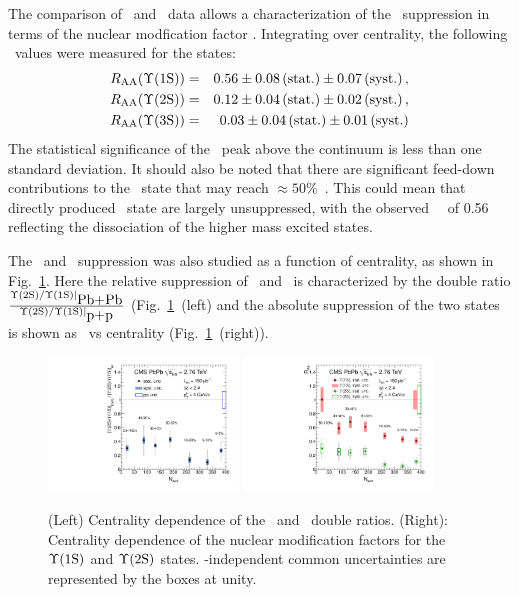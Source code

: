 The comparison of \pp\ and \PbPb\ data allows a characterization of the \PgU\ suppression
in terms of the nuclear modfication factor \Raa.
Integrating over centrality, the following \Raa\ values were measured for the \PgUn states:
\begin{eqnarray}
R_\mathrm{AA} (\Upsilon\mathrm{(1S)}) &=& 0.56 \pm 0.08\,\mbox{(stat.)} \pm 0.07\,\mbox{(syst.)} \,, \\
R_\mathrm{AA} (\Upsilon\mathrm{(2S)}) &=& 0.12 \pm 0.04\,\mbox{(stat.)} \pm 0.02\,\mbox{(syst.)} \,, \nonumber \\
R_\mathrm{AA} (\Upsilon\mathrm{(3S)}) &=& 0.03 \pm 0.04\,\mbox{(stat.)} \pm 0.01\,\mbox{(syst.)}  \nonumber\\
\end{eqnarray}
The statistical significance of the \PgUc\ peak above the continuum is less than one standard deviation.
It should also be noted that there are significant feed-down contributions to 
the \PgUa\ state that may reach $\approx 50\%$~\cite{Affolder:1999wm, Aaij:2012se}.
This could mean that directly produced \PgUa\ state are largely unsuppressed, with
the observed \PgUa\ \Raa\ of 0.56 reflecting the dissociation of the higher mass excited states.

The \PgUa\ and \PgUb\ suppression was also studied as a function of centrality, 
as shown in Fig.~\ref{fig:GR:centrality}.
Here the relative suppression of \PgUa\ and \PgUb\ is characterized by 
the double ratio $\frac{\Upsilon\mathrm{(2S)}/\Upsilon\mathrm{(1S)}|_{\mbox{Pb+Pb}}}{\Upsilon\mathrm{(2S)}/\Upsilon\mathrm{(1S)}|_{\mbox{p+p}}}$ 
(Fig.~\ref{fig:GR:centrality}~(left) and the absolute suppression 
of the two states is shown as \Raa\ vs centrality (Fig.~\ref{fig:GR:centrality}~(right)).

\begin{figure}[t]
\begin{center}
   \includegraphics[width=0.45\textwidth]{qqbarfigures/chi2VsCent}
   \includegraphics[width=0.45\textwidth]{qqbarfigures/RaaPt4}
  \caption{(Left) Centrality dependence of the \PgUa\ and \PgUb\ double ratios.  (Right): 
Centrality dependence of the nuclear modification factors for the $\Upsilon\mathrm{(1S)}$ and $\Upsilon\mathrm{(2S)}$ states. 
\npart-independent common uncertainties are represented by the boxes at unity.}
\label{fig:GR:centrality}
\end{center}
\end{figure}

